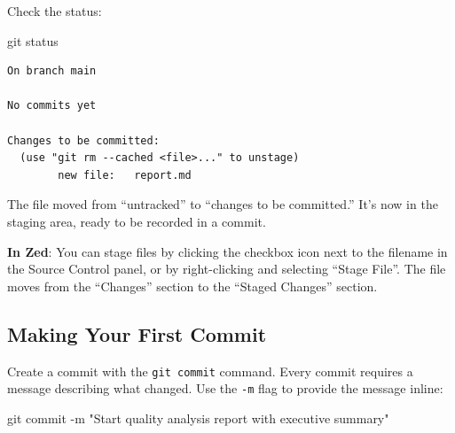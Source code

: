 \documentclass[
  letterpaper,
  DIV=11,
  numbers=noendperiod]{scrreprt}
\newenvironment{Shaded}{\begin{snugshade}}{\end{snugshade}}
\newcommand{\AttributeTok}[1]{\textcolor[rgb]{0.40,0.45,0.13}{#1}}
\newcommand{\FunctionTok}[1]{\textcolor[rgb]{0.28,0.35,0.67}{#1}}
\newcommand{\NormalTok}[1]{\textcolor[rgb]{0.00,0.23,0.31}{#1}}
\newcommand{\StringTok}[1]{\textcolor[rgb]{0.13,0.47,0.30}{#1}}
\begin{document}
Check the status:

\begin{codelisting}

\caption{\texttt{terminal}}

\begin{Shaded}
\begin{Highlighting}[]
\FunctionTok{git}\NormalTok{ status}
\end{Highlighting}
\end{Shaded}

\end{codelisting}

\begin{verbatim}
On branch main

No commits yet

Changes to be committed:
  (use "git rm --cached <file>..." to unstage)
        new file:   report.md
\end{verbatim}

The file moved from ``untracked'' to ``changes to be committed.'' It's
now in the staging area, ready to be recorded in a commit.

\textbf{In Zed}: You can stage files by clicking the checkbox icon next
to the filename in the Source Control panel, or by right-clicking and
selecting ``Stage File''. The file moves from the ``Changes'' section to
the ``Staged Changes'' section.

\subsection{Making Your First Commit}\label{making-your-first-commit}

Create a commit with the \texttt{git\ commit} command. Every commit
requires a message describing what changed. Use the \texttt{-m} flag to
provide the message inline:

\begin{codelisting}

\caption{\texttt{terminal}}

\begin{Shaded}
\begin{Highlighting}[]
\FunctionTok{git}\NormalTok{ commit }\AttributeTok{{-}m} \StringTok{"Start quality analysis report with executive summary"}
\end{Highlighting}
\end{Shaded}

\end{codelisting}
\end{document}
